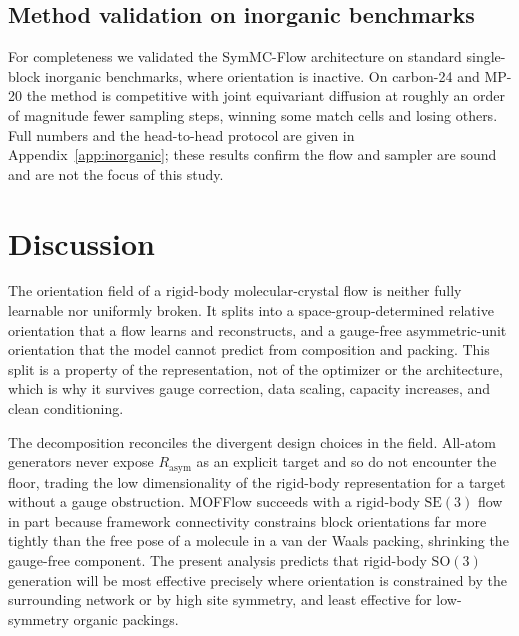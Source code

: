 \documentclass[10pt]{article}
\begin{document}
\subsection{Method validation on inorganic benchmarks}

For completeness we validated the SymMC-Flow architecture on standard
single-block inorganic benchmarks, where orientation is inactive. On carbon-24
and MP-20 the method is competitive with joint equivariant
diffusion \citep{jiao2023diffcsp} at roughly an order of magnitude fewer sampling
steps, winning some match cells and losing others. Full numbers and the
head-to-head protocol are given in Appendix~\ref{app:inorganic}; these results
confirm the flow and sampler are sound and are not the focus of this study.

\section{Discussion}

The orientation field of a rigid-body molecular-crystal flow is neither fully
learnable nor uniformly broken. It splits into a space-group-determined relative
orientation that a flow learns and reconstructs, and a gauge-free
asymmetric-unit orientation that the model cannot predict from composition and
packing. This split is a property of the representation, not of the optimizer or
the architecture, which is why it survives gauge correction, data scaling,
capacity increases, and clean conditioning.

The decomposition reconciles the divergent design choices in the field. All-atom
generators \citep{jin2025oxtal,subramanian2026packflow} never expose
$R_{\text{asym}}$ as an explicit target and so do not encounter the floor,
trading the low dimensionality of the rigid-body representation for a target
without a gauge obstruction. MOFFlow \citep{kim2025mofflow} succeeds with a
rigid-body $\mathrm{SE}(3)$ flow in part because framework connectivity
constrains block orientations far more tightly than the free pose of a molecule
in a van der Waals packing, shrinking the gauge-free component. The present
analysis predicts that rigid-body $\mathrm{SO}(3)$ generation will be most
effective precisely where orientation is constrained by the surrounding network
or by high site symmetry, and least effective for low-symmetry organic packings.
\end{document}
